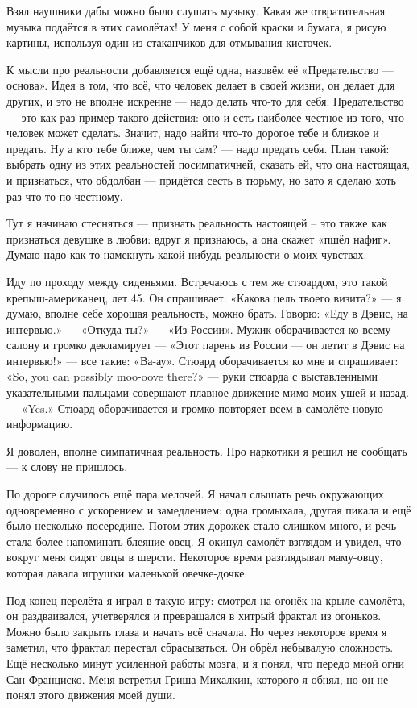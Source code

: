 \documentclass{book}
\begin{document}
Взял наушники дабы можно было слушать музыку.
Какая же отвратительная музыка подаётся в этих самолётах!
У меня с собой краски и бумага, я рисую картины, используя один из стаканчиков для отмывания кисточек.

К мысли про реальности добавляется ещё одна, назовём её «Предательство --- основа».
Идея в том, что всё, что человек делает в своей жизни, он делает для других, и это не вполне искренне --- надо делать что-то для себя.
Предательство --- это как раз пример такого действия: оно и есть наиболее честное из того, что человек может сделать.
Значит, надо найти что-то дорогое тебе и близкое и предать.
Ну а кто тебе ближе, чем ты сам? --- надо предать себя.
План такой: выбрать одну из этих реальностей посимпатичней, сказать ей, что она настоящая, и признаться, что обдолбан --- придётся сесть в тюрьму, но зато я сделаю хоть раз что-то по-честному.

Тут я начинаю стесняться --- признать реальность настоящей -- это также как признаться девушке в любви: вдруг я признаюсь, а она скажет «пшёл нафиг».
Думаю надо как-то намекнуть какой-нибудь реальности о моих чувствах.

Иду по проходу между сиденьями.
Встречаюсь с тем же стюардом, это такой крепыш-американец, лет 45.
Он спрашивает: «Какова цель твоего визита?» --- я думаю, вполне себе хорошая реальность, можно брать.
Говорю: «Еду в Дэвис, на интервью.» --- «Откуда ты?» --- «Из России».
Мужик оборачивается ко всему салону и громко декламирует --- «Этот парень из России --- он летит в Дэвис на интервью!» --- все такие: «Ва-ау».
Стюард оборачивается ко мне и спрашивает: «So, you can possibly moo-oove there?» --- руки стюарда с выставленными указательными пальцами совершают плавное движение мимо моих ушей и назад. ---  «Yes.»
Стюард оборачивается и громко повторяет всем в самолёте новую информацию.

Я доволен, вполне симпатичная реальность.
Про наркотики я решил не сообщать --- к слову не пришлось.

По дороге случилось ещё пара мелочей.
Я начал слышать речь окружающих одновременно с ускорением и замедлением: одна громыхала, другая пикала и ещё было несколько посередине.
Потом этих дорожек стало слишком много, и речь стала более напоминать блеяние овец.
Я окинул самолёт взглядом и увидел, что вокруг меня сидят овцы в шерсти.
Некоторое время разглядывал маму-овцу, которая давала игрушки маленькой овечке-дочке.

Под конец перелёта я играл в такую игру: смотрел на огонёк на крыле самолёта, он раздваивался, учетверялся и превращался в хитрый фрактал из огоньков.
Можно было закрыть глаза и начать всё сначала.
Но через некоторое время я заметил, что фрактал перестал сбрасываться.
Он обрёл небывалую сложность.
Ещё несколько минут усиленной работы мозга, и я понял, что передо мной огни Сан-Франциско.
Меня встретил Гриша Михалкин, которого я обнял, но он не понял этого движения моей души.
\end{document}
